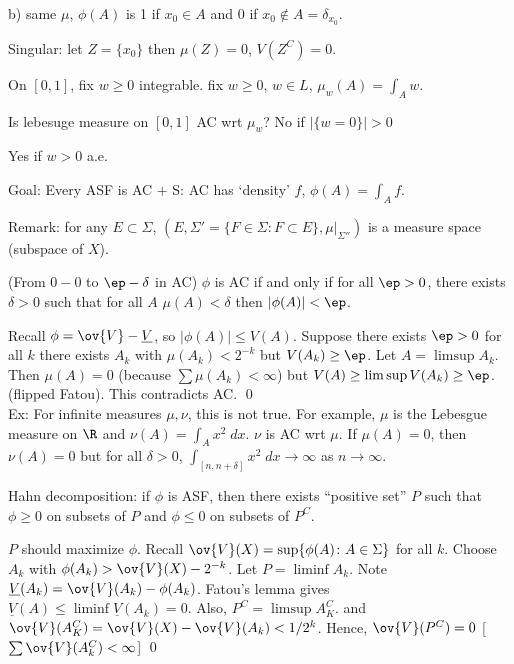 b) same $\mu$, $\phi(A)$ is 1 if $x_0 \in A$ and $0$ if $x_0 \notin A= \delta_{x_0}$. 

Singular: let $Z= \{x_0\}$ then $\mu(Z)=0$, $V(Z^C)=0$. 


On $[0,1]$, fix $w \geq 0$ integrable. 
fix $w \geq 0$, $w \in L$, $\mu_w(A) = \int_A w$.

Is lebesuge measure on $[0,1]$ AC wrt $\mu_w$? No if $|\{w=0\}|>0$ 

Yes if $w>0$ a.e.






Goal: Every ASF is AC $+$ S: AC has `density' $f$, $\phi(A)= \int_A f$. 



Remark: for any $E \subset \Sigma$, $(E, \Sigma'= \{F \in \Sigma \colon F \subset E\}, \mu \big|_{\Sigma''})$ is a measure space (subspace of $X$). 


\begin{thm}
(From $0-0$ to $\ep-\delta$ in AC) $\phi$ is AC if and only if for all $\ep>0$, there exists $\delta>0$ such that for all $A$ $\mu(A)<\delta$ then $|\phi(A)|<\ep$.
\end{thm}

\pf Recall $\phi= \ov{V} - \underline{V}$, so $|\phi(A)| \leq V(A)$. Suppose there exists $\ep>0$ for all $k$ there exists $A_k$ with $\mu(A_k)< 2^{-k}$ but $V(A_k) \geq \ep$. Let $A= \limsup A_k$. Then $\mu(A)=0$ (because $\sum \mu(A_k)< \infty$) but $V(A) \geq \limsup V(A_k) \geq \ep$. (flipped Fatou). This contradicts AC. \qed \\


Ex: For infinite measures $\mu, \nu$, this is not true. For example, $\mu$ is the Lebesgue measure on $\R$ and $\nu(A) = \int_A x^2 \; dx$. $\nu$ is AC wrt $\mu$. If $\mu(A)=0$, then $\nu(A)=0$ but for all $\delta>0$, $\int_{[n,n+\delta]} x^2 \; dx \to \infty$ as $n \to \infty$. 


Hahn decomposition: if $\phi$ is ASF, then there exists ``positive set'' $P$ such that $\phi \geq 0$ on subsets of $P$ and $\phi \leq 0$ on subsets of $P^C$.

\pf $P$ should maximize $\phi$. Recall $\ov{V}(X)= \sup \{ \phi(A) \colon A \in \Sigma\}$ for all $k$. Choose $A_k$ with $\phi(A_k) > \ov{V}(X) - 2^{-k}$. Let $P= \liminf A_k$. Note $\underline{V}(A_k)= \ov{V}(A_k) - \phi(A_k)$. Fatou's lemma gives $\underline{V}(A) \leq \liminf \underline{V}(A_k)= 0$. Also, $P^C= \limsup A_K^C$. and $\ov{V}(A_K^C)= \ov{V}(X) - \ov{V}(A_k)< 1/2^k$. Hence, $\ov{V}(P^C)=0$ [$\sum \ov{V}(A_k^C)<\infty$] \qed \\


